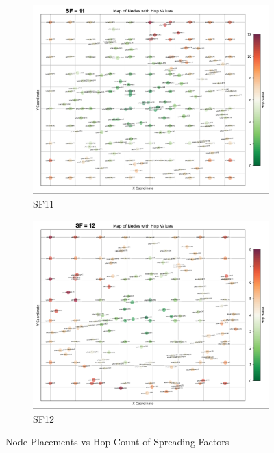 \begin{figure}[ht!]
\begin{subfigure}{0.45\linewidth}
        \includegraphics[width=\linewidth]{images/nodeplacement5.png}
        \caption{SF11}
    \end{subfigure}
    \hfill
    \begin{subfigure}{0.45\linewidth}
        \includegraphics[width=\linewidth]{images/nodeplacement6.png}
        \caption{SF12}
    \end{subfigure}
    \caption{Node Placements vs Hop Count of Spreading Factors}
    \label{fig:nodeplacement collage}
\end{figure}

